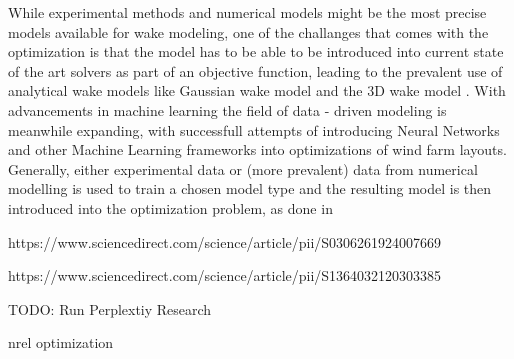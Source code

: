 While experimental methods and numerical models might be the most precise models available for wake modeling, one of the challanges that comes with the optimization is that the model has to be able to be introduced into current state of the art solvers as part of an objective function, leading to the prevalent use of analytical wake models like Gaussian wake model and the 3D wake model  \cite{WANG2024118508}. With advancements in machine learning the field of data - driven modeling is meanwhile expanding, with successfull attempts of introducing Neural Networks and other Machine Learning frameworks into optimizations of wind farm layouts. Generally, either experimental data or (more prevalent) data from numerical modelling is used to train  a chosen model type and the resulting model is then introduced into the optimization problem, as done in \cite{YANG2023119240} \cite{wes-9-869-2024}




https://www.sciencedirect.com/science/article/pii/S0306261924007669

 https://www.sciencedirect.com/science/article/pii/S1364032120303385



TODO: Run Perplextiy Research

nrel optimization